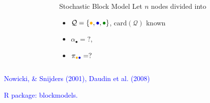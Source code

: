 \documentclass[nopagenumber,9pt]{beamer}
\begin{document}
\begin{frame}
\begin{center}
\begin{overlayarea}{\textwidth}{.5\textheight}
\begin{columns}
\begin{column}{.45\paperwidth}
        \end{column}
        \begin{column}{.5\paperwidth}
          \begin{small}
            \begin{block}{Stochastic Block Model}
              Let $n$ nodes divided into
              \begin{itemize}
              \item
                $\mathcal{Q}=\{\textcolor{yellow!40!orange}{\bullet},\textcolor{blue!80!black}{\bullet},\textcolor{green!50!black}{\bullet}\}$,
                $\text{card}(\mathcal{Q})$ known
              \item  $\alpha_\bullet  =  ?$,
              \item      $\pi_{\textcolor{yellow!40!orange}{\bullet}\textcolor{blue!80!black}{\bullet}}     =      ?$
              \end{itemize}
            \end{block}
          \end{small}
        \end{column}
      \end{columns}
    \end{overlayarea}
    \end{center}
    \medskip

    
    \textcolor{blue}{Nowicki, \& Snijders (2001), Daudin et al. (2008)}
    
    \bigskip
    
\textcolor{blue}{R package: blockmodels.}
%     

\end{frame}
\end{document}
